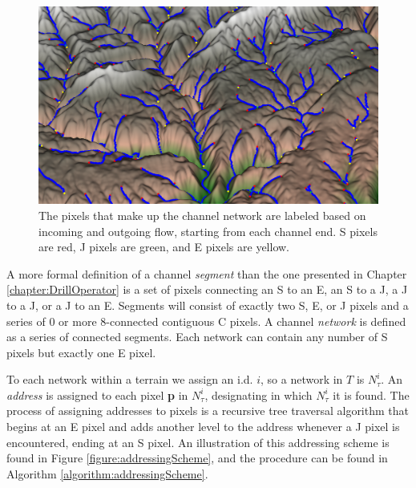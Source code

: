 \begin{figure}[t]
\centering
\begin{minipage}[b]{0.9\linewidth}
\begin{center}
\includegraphics[width=\linewidth]{images/RiverGraph2_crop.png}
\end{center}
\end{minipage}
\caption[Channel pixel assignment visualization]{\label{figure:channelPoints}The pixels that make up the channel network are labeled based on incoming and outgoing flow, starting from each channel end. S pixels are red, J pixels are green, and E pixels are yellow.}
\end{figure}

A more formal definition of a channel \emph{segment} than the one presented in Chapter \ref{chapter:DrillOperator} is a set of pixels connecting an S to an E, an S to a J, a J to a J, or a J to an E. Segments will consist of exactly two S, E, or J pixels and a series of 0 or more 8-connected contiguous C pixels. A channel \emph{network} is defined as a series of connected segments. Each network can contain any number of S pixels but exactly one E pixel.

To each network within a terrain we assign an i.d. $i$, so a network in $T$ is $N^{i}_{\tau}$. An \emph{address} is assigned to each pixel \textbf{p} in $N^i_{\tau}$, designating in which $N^i_{\tau}$ it is found. The process of assigning addresses to pixels is a recursive tree traversal algorithm that begins at an E pixel and adds another level to the address whenever a J pixel is encountered, ending at an S pixel. An illustration of this addressing scheme is found in Figure \ref{figure:addressingScheme}, and the procedure can be found in Algorithm \ref{algorithm:addressingScheme}.

